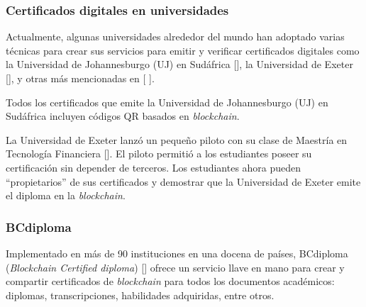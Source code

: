 
\subsubsection{Certificados digitales en universidades}
Actualmente, algunas universidades alrededor del mundo han adoptado varias técnicas para crear sus servicios para emitir y verificar certificados digitales como la Universidad de Johannesburgo (UJ) en Sudáfrica [\cite{80}], la Universidad de Exeter [\cite{76}], y otras más mencionadas en [ \cite{1}]. 

Todos los certificados que emite la Universidad de Johannesburgo (UJ) en Sudáfrica incluyen códigos QR basados en \textit{blockchain}. 

La Universidad de Exeter lanzó un pequeño piloto con su clase de Maestría en Tecnología Financiera [\cite{76}]. El piloto permitió a los estudiantes poseer su certificación sin depender de terceros. Los estudiantes ahora pueden ``propietarios'' de sus certificados y demostrar que la Universidad de Exeter emite el diploma en la \textit{blockchain}.


\subsubsection{BCdiploma}
Implementado en más de 90 instituciones en una docena de países, BCdiploma (\textit{Blockchain Certified diploma}) [\cite{75}] ofrece un servicio llave en mano para crear y compartir certificados de \textit{blockchain} para todos los documentos académicos: diplomas, transcripciones, habilidades adquiridas, entre otros. 



